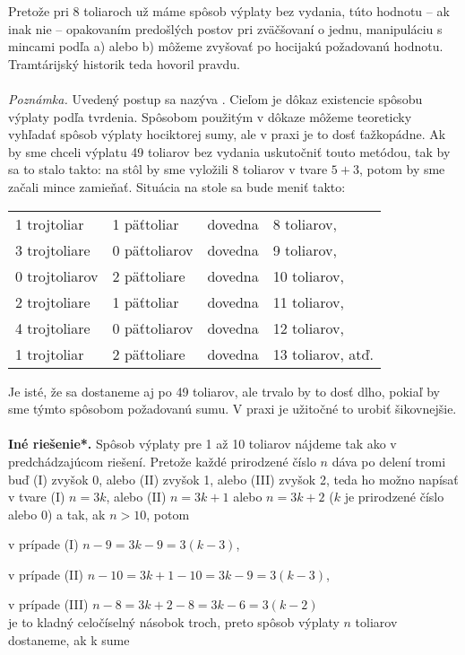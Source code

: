 {Pretože pri 8 toliaroch už máme spôsob výplaty bez vydania, túto hodnotu -- ak inak nie -- opakovaním predošlých postov pri zväčšovaní o jednu, manipuláciu s mincami podľa a) alebo b) môžeme zvyšovať po hocijakú požadovanú hodnotu. Tramtárijský historik teda hovoril pravdu.\\
\\
\textit{Poznámka.} Uvedený postup sa nazýva . Cieľom je dôkaz existencie spôsobu výplaty podľa tvrdenia. Spôsobom použitým v dôkaze môžeme teoreticky vyhľadať spôsob výplaty hociktorej sumy, ale v praxi je to dosť ťažkopádne. Ak by sme chceli výplatu 49 toliarov bez vydania uskutočniť touto metódou, tak by sa to stalo takto: na stôl by sme vyložili 8 toliarov v tvare $5+3$, potom by sme začali mince zamieňať. Situácia na stole sa bude meniť takto:\\
\begin{tabular}{l l l l}
1 trojtoliar & 1 päťtoliar & dovedna & 8 toliarov, \\
3 trojtoliare & 0 päťtoliarov & dovedna & 9 toliarov, \\
0 trojtoliarov & 2 päťtoliare & dovedna & 10 toliarov, \\
2 trojtoliare & 1 päťtoliar & dovedna & 11 toliarov, \\
4 trojtoliare & 0 päťtoliarov & dovedna & 12 toliarov, \\
1 trojtoliar & 2 päťtoliare & dovedna & 13 toliarov, atď.\\
\end{tabular}

Je isté, že sa dostaneme aj po 49 toliarov, ale trvalo by to dosť dlho, pokiaľ by sme týmto spôsobom  požadovanú sumu. V praxi je užitočné to urobiť šikovnejšie.\\
\\
\textbf{Iné riešenie*.} Spôsob výplaty pre 1 až 10 toliarov nájdeme tak ako v predchádzajúcom riešení. Pretože každé prirodzené číslo $n$ dáva po delení tromi buď (I) zvyšok 0, alebo (II) zvyšok 1, alebo (III) zvyšok 2, teda ho možno napísať v tvare (I) $n=3k$, alebo (II) $n=3k+1$ alebo $n=3k+2$ ($k$ je prirodzené číslo alebo 0) a tak, ak $n>10$, potom

v prípade (I) $n-9=3k-9=3(k-3)$,

v prípade (II) $n-10=3k+1-10=3k-9=3(k-3)$,

v prípade (III) $n-8=3k+2-8=3k-6=3(k-2)$\\
je to kladný celočíselný násobok troch, preto spôsob výplaty $n$ toliarov dostaneme, ak k sume

}

